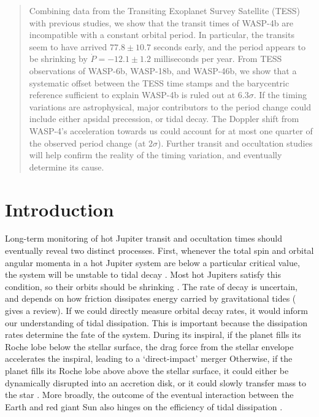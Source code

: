 \documentclass[12pt,twocolumn,tighten]{aastex62}
\begin{document}
\begin{abstract}
  Combining data from the Transiting Exoplanet Survey Satellite (TESS)
  with previous studies, we show that the transit times of WASP-4b are
  incompatible with a constant orbital period. 
  In particular, the transits seem to have arrived $77.8 \pm 10.7$
  seconds early, and the period appears to be shrinking by
  $\dot{P}=-12.1 \pm 1.2$ milliseconds per year.   
  From TESS observations of WASP-6b, WASP-18b, and WASP-46b, we show
  that a systematic offset between the TESS time stamps and the barycentric
  reference sufficient to explain WASP-4b is ruled out at 6.3$\sigma$.
  If the timing variations are astrophysical,
  major contributors to the period change could include either
  apsidal precession, or tidal decay.
  The Doppler shift from WASP-4's acceleration towards us could
  account for at most one quarter of the observed period change
  (at $2\sigma$).
  Further transit and occultation studies will help confirm the
  reality of the timing variation, and eventually determine its cause.
\end{abstract}


\section{Introduction}
\label{sec:intro}

Long-term monitoring of hot Jupiter transit and occultation times
should eventually reveal two distinct processes.  First, whenever the
total spin and orbital angular momenta in a hot Jupiter system are
below a particular critical value, the system will be unstable to
tidal decay \citep{counselman_outcomes_1973,hut_stability_1980}.  Most
hot Jupiters satisfy this condition, so their orbits should be
shrinking \citep{levrard_falling_2009,matsumura_tidal_2010}.  The rate
of decay is uncertain, and depends on how friction dissipates energy
carried by gravitational tides (\citealt{ogilvie_tidal_2014} gives a
review).  If we could directly measure orbital decay rates, it would
inform our understanding of tidal dissipation.  This is important
because the dissipation rates determine the fate of the system.
During its inspiral, if the planet fills its Roche lobe below the
stellar surface, the drag force from the stellar envelope accelerates
the inspiral, leading to a `direct-impact' merger
\citep{metzger_optical_2012,macleod_planetary_2018} Otherwise, if the
planet fills its Roche lobe above above the stellar surface, it could
either be dynamically disrupted into an accretion disk, or it could
slowly transfer mass to the star \citep{metzger_optical_2012}.  More
broadly, the outcome of the eventual interaction between the Earth and
red giant Sun also hinges on the efficiency of tidal dissipation
\citep{rasio_tidal_1996}.
\end{document}
